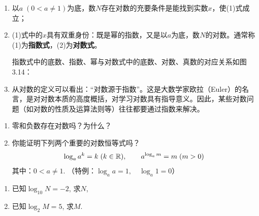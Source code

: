  \begin{note}
 \begin{enumerate}
     \item 以$a\; (0<a\ne 1)$为底，数$N$存在对数的充要条件是能找到实数$x$，使(1)式成立；
     \item (1)式中的$x$具有双重身份：既是幂的指数，又是以$a$为底，数$N$的对数。通常称(1)为\textbf{指数式}，(2)为\textbf{对数式}。
     
     指数式中的底数、指数、幂与对数式中的底数、对数、真数的对应关系如图3.14：
 
 \item 从对数的定义可以看出：“对数源于指数”。这是大数学家欧拉（Euler）的名言，是对对数本质的高度概括，对学习对数具有指导意义。因此，某些对数问题（如对数的性质及运算法则等）往往都要通过指数来解决。
 \end{enumerate}
 \end{note}
 
 \begin{blk}
 \begin{enumerate}[(1)]
     \item 零和负数存在对数吗？为什么？
     \item 你能证明下列两个重要的对数恒等式吗？
 \[\log_a a^k=k\; (k\in\mathbb{R}),\qquad a^{\log_a m}=m\; (m>0)\]
 其中：$0<a\ne 1$.
 （特例：$\log_a a=1,\quad \log_a 1=0$）
 \end{enumerate}
 
 \end{blk}
 
 
 \begin{figure}[htp]
     \centering
     \caption{}
 \end{figure}
 
\begin{example}
\begin{enumerate}[(1)]
    \item 已知$\log_{10}N=-2$, 求$N$,
    \item 已知$\log_2 M=5$, 求$M$.
\end{enumerate}
\end{example}
 

